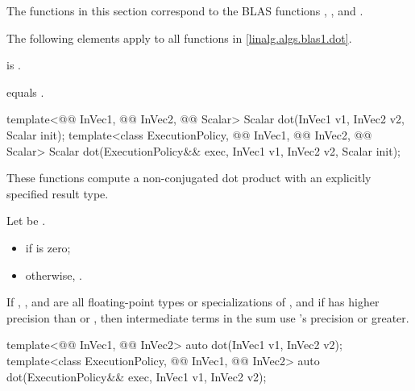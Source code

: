 \pnum
\begin{note}
The functions in this section correspond to the BLAS
functions , , and \supercite{blas1}.
\end{note}

\pnum
The following elements apply to all functions in \ref{linalg.algs.blas1.dot}.

\pnum
\mandates
{} is .

\pnum
\expects
{} equals .

%
\begin{itemdecl}
template<@@ InVec1, @@ InVec2, @@ Scalar>
  Scalar dot(InVec1 v1, InVec2 v2, Scalar init);
template<class ExecutionPolicy, @@ InVec1, @@ InVec2, @@ Scalar>
  Scalar dot(ExecutionPolicy&& exec,
             InVec1 v1, InVec2 v2, Scalar init);
\end{itemdecl}

\begin{itemdescr}
\pnum
These functions compute a non-conjugated dot product
with an explicitly specified result type.

\pnum
\returns
Let  be .
\begin{itemize}
\item
{} if  is zero;
\item
otherwise,
.
\end{itemize}

\pnum
\remarks
If , , and 
are all floating-point types or specializations of ,
and if  has higher precision
than  or ,
then intermediate terms in the sum use 's precision or greater.
\end{itemdescr}

%
\begin{itemdecl}
  template<@@ InVec1, @@ InVec2>
    auto dot(InVec1 v1, InVec2 v2);
  template<class ExecutionPolicy, @@ InVec1, @@ InVec2>
    auto dot(ExecutionPolicy&& exec,
             InVec1 v1, InVec2 v2);
\end{itemdecl}

